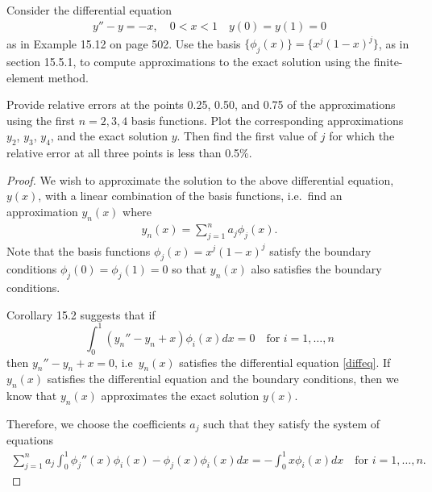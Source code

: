 \begin{problem}
  Consider the differential equation
  \begin{align}\label{diffeq}
    y'' - y = -x,\quad  0<x<1 \quad y(0) = y(1) = 0
  \end{align}
  as in Example 15.12 on page 502.
  Use the basis $\{\phi_j(x)\} = \{x^j(1-x)^j\}$, as in section 15.5.1, to
  compute approximations to the exact solution using the finite-element method.

  Provide relative errors at the points 0.25, 0.50, and 0.75 of the approximations
  using the first $n=2,3,4$ basis functions. Plot
  the corresponding approximations $y_2$, $y_3$, $y_4$, and the exact solution
  $y$. Then find the first value of $j$ for which the relative error at all
  three points is less than 0.5\%.
\end{problem}

\begin{proof}
  We wish to approximate the solution to the above differential equation, $y(x)$,
  with a linear combination of the basis functions, i.e.\ find an approximation
  $y_n(x)$ where
  \begin{align}\label{finite_approximation}
    y_n(x) = \sum_{j=1}^n a_j \phi_j(x).
  \end{align}
  Note that the basis functions $\phi_j(x) = x^j(1-x)^j$ satisfy the boundary
  conditions $\phi_j(0) = \phi_j(1) = 0$ so that $y_n(x)$ also satisfies the
  boundary conditions.

  Corollary 15.2 suggests that if
  \[
    \int_0^1 (y_n'' - y_n + x)\phi_i(x) dx = 0 \quad \text{for $i=1,\dots,n$}
  \]
  then $y_n'' - y_n + x = 0$, i.e\ $y_n(x)$ satisfies the differential
  equation \eqref{diffeq}. If $y_n(x)$ satisfies the
  differential equation and the boundary conditions, then we know that $y_n(x)$
  approximates the exact solution $y(x)$.

  Therefore, we choose the coefficients $a_j$ such that they satisfy the system of
  equations
  \begin{align*}
    \sum_{j=1}^n a_j \int_0^1 \phi_j''(x)\phi_i(x) - \phi_j(x)\phi_i(x) dx = -\int_0^1 x \phi_i(x) dx \quad \text{for $i=1,\dots,n$}.
  \end{align*}
\end{proof}